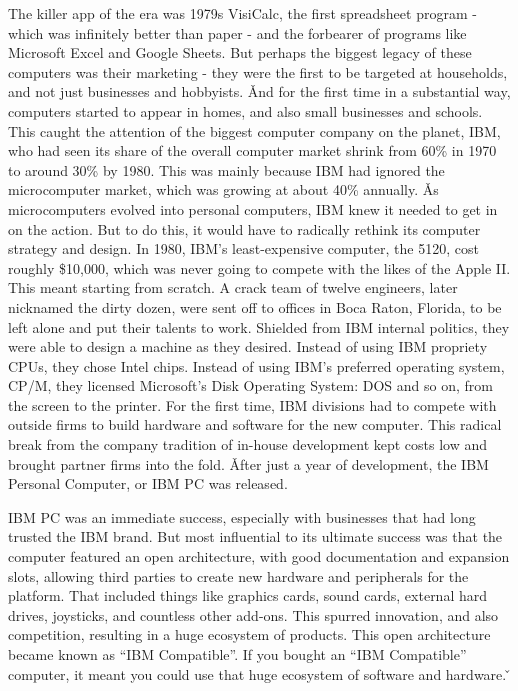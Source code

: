 The killer app of the era was 1979s VisiCalc, the first spreadsheet program - which was infinitely better than paper
- and the forbearer of programs like Microsoft Excel and Google Sheets. But perhaps the biggest legacy of these
computers was their marketing - they were the first to be targeted at households, and not just businesses and
hobbyists. \v

And for the first time in a substantial way, computers started to appear in homes, and also small businesses and
schools. This caught the attention of the biggest computer company on the planet, IBM, who had seen its share of the
overall computer market shrink from 60\% in 1970 to around 30\% by 1980. This was mainly because IBM had ignored the
microcomputer market, which was growing at about 40\% annually. \v

As microcomputers evolved into personal computers, IBM knew it needed to get in on the action. But to do this, it
would have to radically rethink its computer strategy and design. In 1980, IBM's least-expensive computer, the 5120,
cost roughly \$10,000, which was never going to compete with the likes of the Apple II. This meant starting from
scratch. A crack team of twelve engineers, later nicknamed the dirty dozen, were sent off to offices in Boca Raton,
Florida, to be left alone and put their talents to work. Shielded from IBM internal politics, they were able to
design a machine as they desired. Instead of using IBM propriety CPUs, they chose Intel chips. Instead of using IBM's
preferred operating system, CP/M, they licensed Microsoft's Disk Operating System: DOS and so on, from the screen to
the printer. For the first time, IBM divisions had to compete with outside firms to build hardware and software for
the new computer. This radical break from the company tradition of in-house development kept costs low and brought
partner firms into the fold. \v

After just a year of development, the IBM Personal Computer, or IBM PC was released.


IBM PC was an immediate success, especially with businesses that had long trusted the IBM brand. But most influential
to its ultimate success was that the computer featured an open architecture, with good documentation and expansion
slots, allowing third parties to create new hardware and peripherals for the platform. That included things like
graphics cards, sound cards, external hard drives, joysticks, and countless other add-ons. This spurred innovation,
and also competition, resulting in a huge ecosystem of products. This open architecture became known as ``IBM
Compatible''. If you bought an ``IBM Compatible'' computer, it meant you could use that huge ecosystem of software
and hardware. \v

